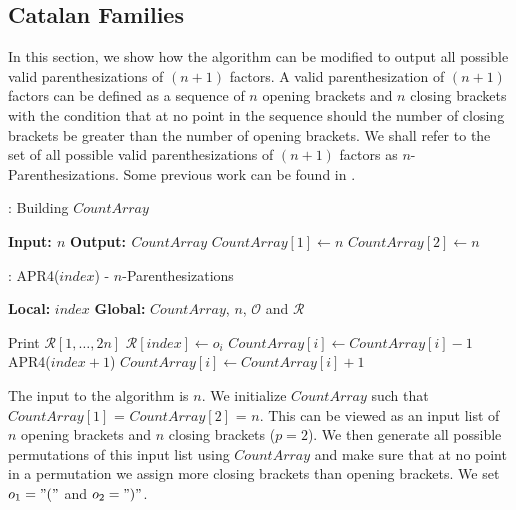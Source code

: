 \documentclass{article}
\begin{document}
\subsection{Catalan Families}

In this section, we show how the algorithm can be modified to output all possible valid parenthesizations of $(n+1)$ factors. A valid parenthesization of $(n+1)$ factors can be defined as a sequence of $n$ opening brackets and $n$ closing brackets with the condition that at no point in the sequence should the number of closing brackets be greater than the number of opening brackets. We shall refer to the set of all possible valid parenthesizations of $(n+1)$ factors as $n$-Parenthesizations. Some previous work can be found in \cite{catalan2, knuth_perm}.

\begin{algorithm}
\caption{: Building $CountArray$}
\label{countCat}
\begin{algorithmic}[1]
\STATE \textbf{Input: $n$}
\STATE \textbf{Output: $CountArray$}
\medskip
 \STATE $CountArray[1] \gets n$
 \STATE $CountArray[2] \gets n$
\end{algorithmic}
\end{algorithm}

\begin{algorithm}
\begin{algorithmic}[1]
\caption{: APR4($index$) - $n$-Parenthesizations}
\label{permCat}
\STATE \textbf{Local:} $index$
\STATE \textbf{Global:} $CountArray$, $n$, $\mathcal{O}$ and $\mathcal{R}$
\medskip

	\STATE Print $\mathcal{R}[1, \ldots, 2n]$
	\RETURN
\ELSE
{}
		\STATE $\mathcal{R}[index] \gets o_i$ 
		\STATE $CountArray[i] \gets CountArray[i] - 1$
		\STATE APR4($index + 1$)
		\STATE $CountArray[i] \gets CountArray[i] + 1$
	\ENDIF
\ENDFOR
\ENDIF
\end{algorithmic}
\end{algorithm}

The input to the algorithm is $n$. We initialize $CountArray$ such that $CountArray[1]$ = $CountArray[2]$ = $n$. This can be viewed as an input list of $n$ opening brackets and $n$ closing brackets ($p = 2$). We then generate all possible permutations of this input list using $CountArray$ and make sure that at no point in a permutation we assign more closing brackets than opening brackets. We set $o_1 = "("$ and $o_2 = ")"$.
\end{document}
